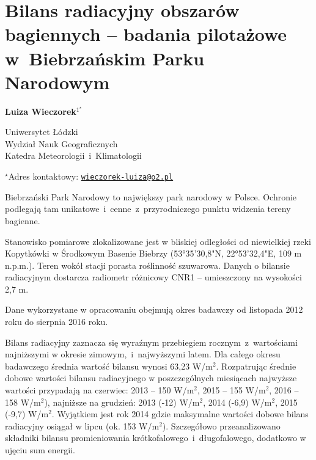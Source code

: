 \documentclass[\main/boa.tex]{subfiles}
\begin{document}
\sloppy


\section{Bilans radiacyjny obszarów bagiennych -- badania pilotażowe w~Biebrzańskim Parku Narodowym}

\begin{center}
  {\bf {} Luiza Wieczorek$^{1^\star}$}
\end{center}

\vskip 0.3cm

\begin{affiliations}
\begin{enumerate}
\begin{minipage}{0.915\textwidth}
\centering
\item Uniwersytet Łódzki \\ Wydział Nauk Geograficznych \\ Katedra Meteorologii~i~Klimatologii\\[-2pt]
\end{minipage}
\end{enumerate}
$^\star$Adres kontaktowy: \href{mailto:wieczorek-luiza@o2.pl}{\nolinkurl{wieczorek-luiza@o2.pl}}\\
\end{affiliations}

\vskip 0.5cm


\vskip 0.5cm

Biebrzański Park Narodowy to największy park narodowy w Polsce. Ochronie podlegają tam unikatowe~i~cenne~z~przyrodniczego punktu widzenia tereny bagienne. 

Stanowisko pomiarowe zlokalizowane jest w bliskiej odległości od niewielkiej rzeki Kopytkówki w Środkowym Basenie Biebrzy (53°35'30,8"N, 22°53'32,4"E, 109 m n.p.m.). Teren wokół stacji porasta roślinność szuwarowa. Danych o bilansie radiacyjnym dostarcza radiometr różnicowy CNR1 – umieszczony na wysokości 2,7 m. 

Dane wykorzystane w opracowaniu obejmują okres badawczy od listopada 2012 roku do sierpnia 2016 roku.

Bilans radiacyjny zaznacza się wyraźnym przebiegiem rocznym~z~wartościami najniższymi w okresie zimowym,~i~najwyższymi latem. Dla całego okresu badawczego średnia wartość bilansu wynosi 63,23 W/m$^{2}$. Rozpatrując średnie dobowe wartości bilansu radiacyjnego w poszczególnych miesiącach najwyższe wartości przypadają na czerwiec: 2013 -- 150 W/m$^{2}$, 2015 -- 155 W/m$^{2}$, 2016 -- 158 W/m$^{2}$), najniższe na grudzień: 2013 (-12) W/m$^{2}$, 2014               (-6,9) W/m$^{2}$, 2015 (-9,7) W/m$^{2}$. Wyjątkiem jest rok 2014 gdzie maksymalne wartości dobowe bilans radiacyjny osiągał w lipcu (ok. 153 W/m$^{2}$). Szczegółowo przeanalizowano składniki bilansu promieniowania krótkofalowego~i~długofalowego, dodatkowo w ujęciu sum energii. 
\end{document}
